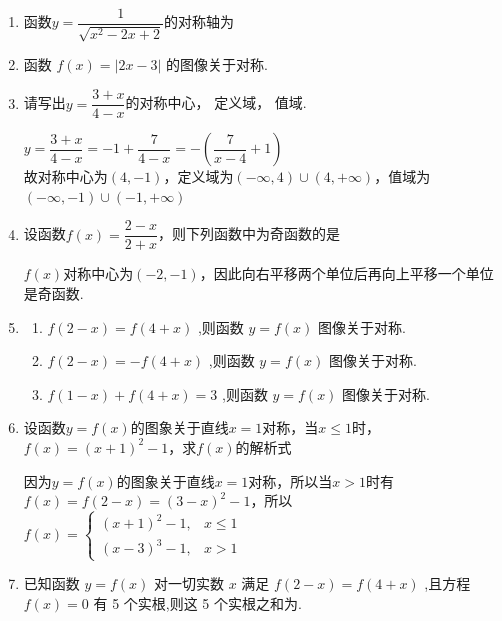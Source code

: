 \begin{enumerate}
    \item 函数$y = \dfrac{1}{\sqrt{x^2-2x+2}}$的对称轴为
    \item 函数 $f\left( x\right)  = \left| {{2x} - 3}\right|$ 的图像关于对称.
    \item 请写出$y = \dfrac{3+x}{4-x}$的对称中心， 定义域， 值域.
    \begin{jieda}
    $y = \dfrac{3+x}{4-x} = -1 + \dfrac{7}{4-x} = -\left(\dfrac{7}{x-4} + 1\right)$ \\
    故对称中心为$(4, -1)$，定义域为$(-\infty, 4) \cup (4, +\infty)$，值域为$(-\infty, -1) \cup (-1, +\infty)$
    \end{jieda}
    \item 设函数$f(x) = \dfrac{2-x}{2+x}$，则下列函数中为奇函数的是
    \begin{jieda}
        $f(x)$对称中心为$(-2, -1)$，因此向右平移两个单位后再向上平移一个单位是奇函数.
    \end{jieda}
    \item \begin{enumerate}
        \item $f\left( {2 - x}\right)  = f\left( {4 + x}\right)$ ,则函数 $y = f\left( x\right)$ 图像关于对称.
        \item $f\left( {2 - x}\right)  =  - f\left( {4 + x}\right)$ ,则函数 $y = f\left( x\right)$ 图像关于对称.
        \item $f\left( {1 - x}\right)  + f\left( {4 + x}\right)  = 3$ ,则函数 $y = f\left( x\right)$ 图像关于对称.
    \end{enumerate}
    \item 设函数$y = f(x)$的图象关于直线$x = 1$对称，当$x \leq 1$时，$f(x) = (x+1)^2-1$，求$f(x)$的解析式
    \begin{jieda}
        因为$y = f(x)$的图象关于直线$x = 1$对称，所以当$x > 1$时有$f(x) = f(2-x) = (3-x)^2-1$，所以$f(x) = \left\{\begin{array}{ll}
             (x+1)^2-1, & x \leq 1 \\
             (x-3)^3-1, & x > 1 
        \end{array}\right.$
    \end{jieda}
    \item 已知函数 $y = f\left( x\right)$ 对一切实数 $x$ 满足 $f\left( {2 - x}\right)  = f\left( {4 + x}\right)$ ,且方程 $f\left( x\right)  = 0$ 有 5 个实根,则这 5 个实根之和为.

\end{enumerate}
